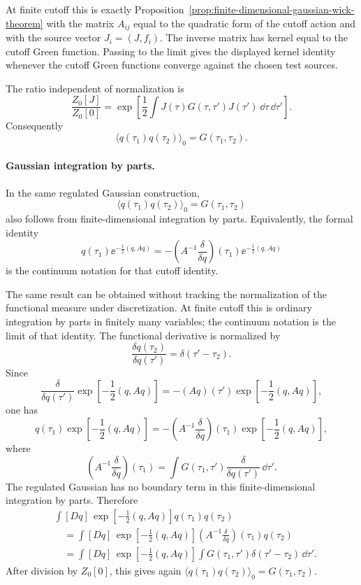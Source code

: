 At finite cutoff this is exactly
Proposition~\ref{prop:finite-dimensional-gaussian-wick-theorem} with the
matrix \(A_{ij}\) equal to the quadratic form of the cutoff action and with
the source vector \(J_i=(J,f_i)\).  The inverse matrix has kernel equal to
the cutoff Green function.  Passing to the limit gives the displayed kernel
identity whenever the cutoff Green functions converge against the chosen
test sources.

The ratio independent of normalization is
\[
  \frac{Z_0[J]}{Z_0[0]}
  =
  \exp\left[
    \frac12\int J(\tau)G(\tau,\tau')J(\tau')\,
    \dd\tau\,\dd\tau'
  \right].
\]
Consequently
\[
  \langle q(\tau_1)q(\tau_2)\rangle_0
  =
  G(\tau_1,\tau_2).
\]

\paragraph{Gaussian integration by parts.}
In the same regulated Gaussian construction,
\[
  \langle q(\tau_1)q(\tau_2)\rangle_0=G(\tau_1,\tau_2)
\]
also follows from finite-dimensional integration by parts.  Equivalently,
the formal identity
\[
  q(\tau_1)\ee^{-\frac12(q,Aq)}
  =
  -
  \left(A^{-1}\frac{\delta}{\delta q}\right)(\tau_1)
  \ee^{-\frac12(q,Aq)}
\]
is the continuum notation for that cutoff identity.

The same result can be obtained without tracking the normalization of the
functional measure under discretization.  At finite cutoff this is ordinary
integration by parts in finitely many variables; the continuum notation is the
limit of that identity.  The functional derivative is normalized by
\[
  \frac{\delta q(\tau_2)}{\delta q(\tau')}=\delta(\tau'-\tau_2).
\]
Since
\[
  \frac{\delta}{\delta q(\tau')}
  \exp\left[-\frac12(q,Aq)\right]
  =
  -(Aq)(\tau')\exp\left[-\frac12(q,Aq)\right],
\]
one has
\[
  q(\tau_1)\exp\left[-\frac12(q,Aq)\right]
  =
  -
  \left(A^{-1}\frac{\delta}{\delta q}\right)(\tau_1)
  \exp\left[-\frac12(q,Aq)\right],
\]
where
\[
  \left(A^{-1}\frac{\delta}{\delta q}\right)(\tau_1)
  =
  \int G(\tau_1,\tau')\frac{\delta}{\delta q(\tau')}\,\dd\tau'.
\]
The regulated Gaussian has no boundary term in this finite-dimensional
integration by parts. Therefore
\[
\begin{aligned}
  &\int[Dq]\,\exp\left[-\frac12(q,Aq)\right]
    q(\tau_1)q(\tau_2)  \\
  &\quad =
  \int[Dq]\,\exp\left[-\frac12(q,Aq)\right]
  \left(A^{-1}\frac{\delta}{\delta q}\right)(\tau_1)q(\tau_2)  \\
  &\quad =
  \int[Dq]\,\exp\left[-\frac12(q,Aq)\right]
  \int G(\tau_1,\tau')\delta(\tau'-\tau_2)\,\dd\tau' .
\end{aligned}
\]
After division by \(Z_0[0]\), this gives again
\(\langle q(\tau_1)q(\tau_2)\rangle_0=G(\tau_1,\tau_2)\).

